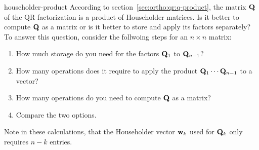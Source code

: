 \begin{Problem}{householder-product}
  According to section~\ref{sec:ortho:qr:q-product}, the matrix
  $\mathbf Q$ of the QR factorization is a product of Householder
  matrices. Is it better to compute $\mathbf Q$ as a matrix or is it
  better to store and apply its factors separately? To answer this
  question, consider the follwoing steps for an $n\times n$ matrix:
  \begin{enumerate}
  \item How much storage do you need for the factors $\mathbf Q_1$ to $\mathbf Q_{n-1}$?
  \item How many operations does it require to apply the product
    $\mathbf Q_1\cdots\mathbf Q_{n-1}$ to a vector?
  \item How many operations do you need to compute $\mathbf Q$ as a matrix?
  \item Compare the two options.
  \end{enumerate}
  Note in these calculations, that the Householder vector $\mathbf w_k$ used
  for $\mathbf Q_k$ only requires $n-k$ entries.
\end{Problem}


